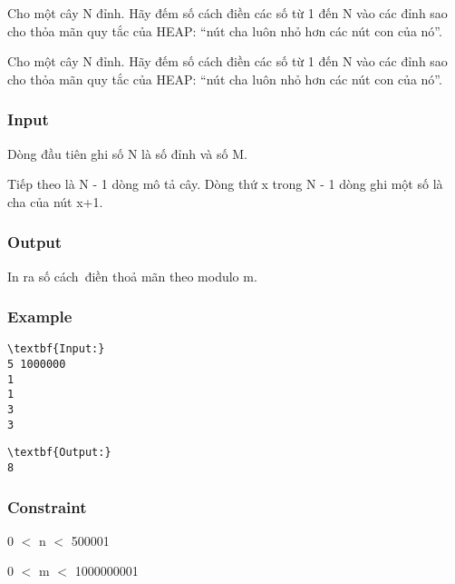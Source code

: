 

Cho một cây N đỉnh. Hãy đếm số cách điền các số từ 1 đến N vào các đỉnh sao cho thỏa mãn quy tắc của HEAP: “nút cha luôn nhỏ hơn các nút con của nó”.

Cho một cây N đỉnh. Hãy đếm số cách điền các số từ 1 đến N vào các đỉnh sao cho thỏa mãn quy tắc của HEAP: “nút cha luôn nhỏ hơn các nút con của nó”.

\subsubsection{Input}

Dòng đầu tiên ghi số N là số đỉnh và số M.

Tiếp theo là N - 1 dòng mô tả cây. Dòng thứ x trong N - 1 dòng ghi một số là cha của nút x+1.

\subsubsection{Output}

In ra số cách điền thoả mãn theo modulo m.

\subsubsection{Example}
\begin{verbatim}
\textbf{Input:}
5 1000000
1
1
3
3\end{verbatim}
\begin{verbatim}
\textbf{Output:}
8\end{verbatim}

\subsubsection{Constraint}

0 $<$ n $<$ 500001

0 $<$ m $<$ 1000000001